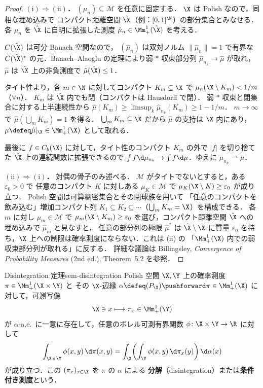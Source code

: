 \begin{proof}
  \textbf{$(\mathrm{i}) \Rightarrow (\mathrm{ii})$．}
  $(\mu_n) \subseteq \mathcal{M}$ を任意に固定する．
  $\X$ は Polish なので，同相な埋め込みで
  コンパクト距離空間 $\hat{\X}$（例：$[0, 1]^\N$）の部分集合とみなせる．
  各 $\mu_n$ を $\hat{\X}$ に自明に拡張した測度
  $\hat{\mu}_n \in \Mm_+^1(\hat{\X})$ を考える．

  $C(\hat{\X})$ は可分 Banach 空間なので，
  $(\hat{\mu}_n)$ は双対ノルム $\|\hat{\mu}_n\| = 1$ で有界な
  $C(\hat{\X})^*$ の元．Banach--Alaoglu の定理により弱 $*$ 収束部分列
  $\hat{\mu}_{n_k} \to \hat{\mu}$ が取れ，
  $\hat{\mu}$ は $\hat{\X}$ 上の非負測度で $\hat{\mu}(\hat{\X}) \leq 1$．

  タイト性より，各 $m \in \N$ に対してコンパクト $K_m \subseteq \X$ で
  $\mu_n(\X \setminus K_m) < 1/m$（$\forall n$）．
  $K_m$ は $\hat{\X}$ 内でも閉（コンパクトは Hausdorff で閉）．
  弱 $*$ 収束と閉集合に対する上半連続性から
  $\hat{\mu}(K_m) \geq \limsup_k \hat{\mu}_{n_k}(K_m) \geq 1 - 1/m$．
  $m \to \infty$ で $\hat{\mu}\!\left(\bigcup_m K_m\right) = 1$ を得る．
  $\bigcup_m K_m \subseteq \X$ だから $\hat{\mu}$ の支持は $\X$ 内にあり，
  $\mu \defeq \hat{\mu}|_\X \in \Mm_+^1(\X)$ として取れる．

  最後に $f \in C_b(\X)$ に対して，タイト性のコンパクト $K_m$ の外で
  $|f|$ を切り捨てた $\hat{\X}$ 上の連続関数に拡張できるので
  $\int f \d\mu_{n_k} \to \int f \d\mu$．ゆえに $\mu_{n_k} \rightharpoonup \mu$．

  \textbf{$(\mathrm{ii}) \Rightarrow (\mathrm{i})$．} 対偶の骨子のみ述べる．
  $\mathcal{M}$ がタイトでないとすると，ある $\varepsilon_0 > 0$ で
  任意のコンパクト $K$ に対しある $\mu_K \in \mathcal{M}$ で
  $\mu_K(\X \setminus K) \geq \varepsilon_0$ が成り立つ．
  Polish 空間は可算稠密集合とその閉球族を用いて
  「任意のコンパクトを飲み込む」増加コンパクト列
  $K_1 \subseteq K_2 \subseteq \cdots$（$\bigcup_m K_m = \X$）を構成できる．
  各 $m$ に対し $\mu_m \in \mathcal{M}$ で $\mu_m(\X \setminus K_m) \geq \varepsilon_0$
  を選び，コンパクト距離空間 $\hat{\X}$ への埋め込みで $\hat{\mu}_m$ と見なすと，
  任意の部分列の極限 $\hat{\mu}^*$ は $\hat{\X} \setminus \X$ に質量 $\varepsilon_0$
  を持ち，$\X$ 上への制限は確率測度にならない．これは (ii) の
  「$\Mm_+^1(\X)$ 内での弱収束部分列が取れる」に反する．
  詳細な議論は
  Billingsley, \textit{Convergence of Probability Measures} (2nd ed.),
  Theorem~5.2 を参照．
\end{proof}

\begin{proposition}{Disintegration 定理}{sem-disintegration}
  Polish 空間 $\X, \Y$ 上の確率測度 $\pi \in \Mm_+^1(\X \times \Y)$ と
  その $\X$-辺縁 $\alpha \defeq (P_\X)\pushforward \pi \in \Mm_+^1(\X)$
  に対して，可測写像
  \[
    \X \ni x \longmapsto \pi_x \in \Mm_+^1(\Y)
  \]
  が $\alpha$-a.e.\ に一意に存在して，任意のボレル可測有界関数
  $\phi \colon \X \times \Y \to \R$ に対して
  \[
    \int_{\X \times \Y} \phi(x, y) \, \d\pi(x, y)
    = \int_\X \!\left( \int_\Y \phi(x, y) \, \d\pi_x(y) \right) \d\alpha(x)
  \]
  が成り立つ．この $(\pi_x)_{x \in \X}$ を $\pi$ の $\alpha$ による
  \textbf{分解}（disintegration）または\textbf{条件付き測度}という．
\end{proposition}

